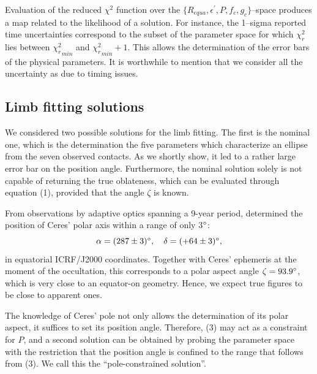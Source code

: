 \documentclass[useAMS,usenatbib]{mn2e}
\begin{document}
Evaluation of the reduced $\chi^2$ function over the $\lbrace R_{equa}, \epsilon^\prime, P, f_c, g_c \rbrace$--space produces a map related to the likelihood of a solution. For instance, the 1--sigma reported time uncertainties correspond to the subset of the parameter space for which $\chi^2_r$ lies between ${\chi^2_r}_{min}$ and ${\chi^2_r}_{min} + 1$. This allows the determination of the error bars of the physical parameters. It is worthwhile to mention that we consider all the uncertainty as due to timing issues.





\subsection{Limb fitting solutions}

We considered two possible solutions for the limb fitting. The first is the nominal one, which is the determination the five parameters which characterize an ellipse from the seven observed contacts. As we shortly show, it led to a rather large error bar on the position angle. Furthermore, the nominal solution solely is not capable of returning the true oblateness, which can be evaluated through equation (1), provided that the angle $\zeta$ is known.%

From observations by adaptive optics spanning a 9-year period, \cite{Drummond2014} determined the position of Ceres' polar axis within a range of only 3$\hbox{$^\circ$}$:
\begin{equation}
\alpha = (287 \pm 3) \degr, \quad %
\delta = (+64 \pm 3) \degr,
\end{equation}
%
in equatorial ICRF/J2000 coordinates. Together with Ceres' ephemeris at the moment of the occultation, this corresponds to a polar aspect angle $\zeta = 93.9\hbox{$^\circ$}$, which is very close to an equator-on geometry. Hence, we expect true figures to be close to apparent ones.

The knowledge of Ceres' pole not only allows the determination of its polar aspect, it suffices to set its position angle. Therefore, (3) may act as a constraint for $P$, and a second solution can be obtained by probing the parameter space with the restriction that the position angle is confined to the range that follows from (3). We call this the ``pole-constrained solution''.
\end{document}
